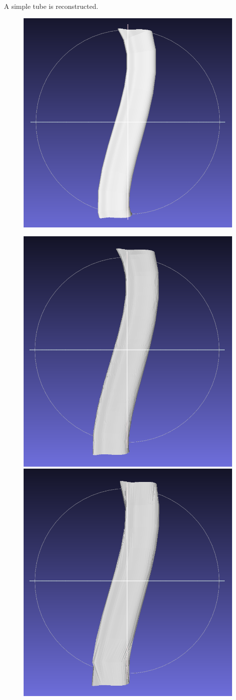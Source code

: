 \documentclass[11p, titlepage]{article}
\newcommand{\reconstructionleft}{0.3}
\newcommand{\reconstructionright}{0.67}
\begin{document}
A simple tube is reconstructed.

\begin{figure}[h!]
     \centering
     \begin{minipage}[b]{\reconstructionleft\linewidth}
       {\includegraphics[width=\linewidth]{originals/simple}}%
     \end{minipage}%
     \hfill
     \begin{minipage}[b]{\reconstructionright\linewidth}
       {\includegraphics[width=.48\linewidth]{reconstructions/dtw-simple-50}}%
       \hfill
       {\includegraphics[width=.48\linewidth]{reconstructions/dtw-simple-10}}

\end{minipage}
\end{figure}
\end{document}

